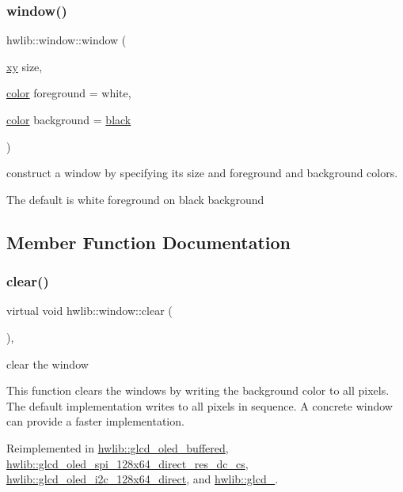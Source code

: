\subsubsection{\texorpdfstring{window()}{window()}}
{\footnotesize\ttfamily hwlib\+::window\+::window (\begin{DoxyParamCaption}\item[{\hyperlink{classhwlib_1_1xy}{xy}}]{size,  }\item[{\hyperlink{classhwlib_1_1color}{color}}]{foreground = {\ttfamily white},  }\item[{\hyperlink{classhwlib_1_1color}{color}}]{background = {\ttfamily \hyperlink{namespacehwlib_aa9c056fa29bc9af9f55d4b774bb3898a}{black}} }\end{DoxyParamCaption})\hspace{0.3cm}{\ttfamily [inline]}}

construct a window by specifying its size and foreground and background colors.

The default is white foreground on black background 

\subsection{Member Function Documentation}
\mbox{\label{classhwlib_1_1window_a5e781163353ce26cb4dc5b2cbe40ad05}} 
\subsubsection{\texorpdfstring{clear()}{clear()}\hspace{0.1cm}{\footnotesize\ttfamily [1/3]}}
{\footnotesize\ttfamily virtual void hwlib\+::window\+::clear (\begin{DoxyParamCaption}{ }\end{DoxyParamCaption})\hspace{0.3cm}{\ttfamily [inline]}, {\ttfamily [virtual]}}

clear the window

This function clears the windows by writing the background color to all pixels. The default implementation writes to all pixels in sequence. A concrete window can provide a faster implementation. 

Reimplemented in \hyperlink{classhwlib_1_1glcd__oled__buffered_a1df3ca6d163e33b2edf1242acf47342a}{hwlib\+::glcd\+\_\+oled\+\_\+buffered}, \hyperlink{classhwlib_1_1glcd__oled__spi__128x64__direct__res__dc__cs_afebf8245a39c31859ef21eae3d9deb69}{hwlib\+::glcd\+\_\+oled\+\_\+spi\+\_\+128x64\+\_\+direct\+\_\+res\+\_\+dc\+\_\+cs}, \hyperlink{classhwlib_1_1glcd__oled__i2c__128x64__direct_a283c1ff2e898f5f2b23dfdce6209b55e}{hwlib\+::glcd\+\_\+oled\+\_\+i2c\+\_\+128x64\+\_\+direct}, and \hyperlink{classhwlib_1_1glcd__5510_a533b2663e151bee909543d0038b2cb4d}{hwlib\+::glcd\+\_}.

